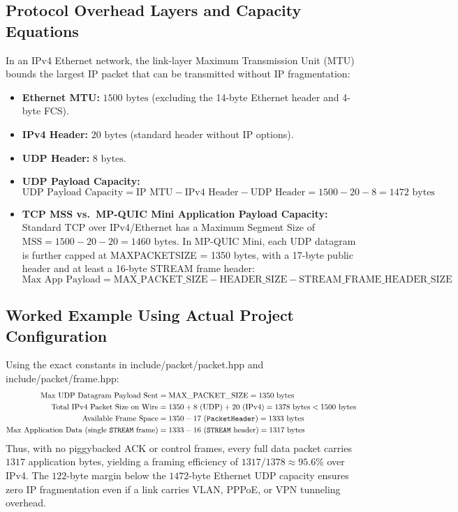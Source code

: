 \documentclass[10pt,a4paper]{article}
\newcommand{\codeul}{\textunderscore\hspace{0pt}}
\DeclareRobustCommand{\code}[1]{{\ttfamily\let\_\codeul #1}}
\begin{document}
\subsection{Protocol Overhead Layers and Capacity Equations}
In an IPv4 Ethernet network, the link-layer Maximum Transmission Unit (MTU) bounds the largest IP packet that can be transmitted without IP fragmentation:
\begin{itemize}
    \item \textbf{Ethernet MTU:} $1500\text{ bytes}$ (excluding the 14-byte Ethernet header and 4-byte FCS).
    \item \textbf{IPv4 Header:} $20\text{ bytes}$ (standard header without IP options).
    \item \textbf{UDP Header:} $8\text{ bytes}$.
    \item \textbf{UDP Payload Capacity:}
    \begin{equation}
        \text{UDP Payload Capacity} = \text{IP MTU} - \text{IPv4 Header} - \text{UDP Header} = 1500 - 20 - 8 = 1472\text{ bytes}
    \end{equation}
    \item \textbf{TCP MSS vs.\ MP-QUIC Mini Application Payload Capacity:} Standard TCP over IPv4/Ethernet has a Maximum Segment Size of $\text{MSS} = 1500 - 20 - 20 = 1460\text{ bytes}$. In MP-QUIC Mini, each UDP datagram is further capped at \code{MAX\_PACKET\_SIZE = 1350} bytes, with a 17-byte public header and at least a 16-byte \code{STREAM} frame header:
    \begin{equation}
        \text{Max App Payload} = \text{MAX\_PACKET\_SIZE} - \text{HEADER\_SIZE} - \text{STREAM\_FRAME\_HEADER\_SIZE}
    \end{equation}
\end{itemize}

\subsection{Worked Example Using Actual Project Configuration}
Using the exact constants in \code{include/packet/packet.hpp} and \code{include/packet/frame.hpp}:
\begin{align*}
    \text{Max UDP Datagram Payload Sent} &= \text{MAX\_PACKET\_SIZE} = 1350\text{ bytes} \\
    \text{Total IPv4 Packet Size on Wire} &= 1350 + 8\text{ (UDP)} + 20\text{ (IPv4)} = 1378\text{ bytes} < 1500\text{ bytes} \\
    \text{Available Frame Space} &= 1350 - 17\text{ (\code{PacketHeader})} = 1333\text{ bytes} \\
    \text{Max Application Data (single \code{STREAM} frame)} &= 1333 - 16\text{ (\code{STREAM} header)} = 1317\text{ bytes}
\end{align*}
Thus, with no piggybacked ACK or control frames, every full data packet carries $1317$ application bytes, yielding a framing efficiency of $1317 / 1378 \approx 95.6\%$ over IPv4. The $122$-byte margin below the $1472$-byte Ethernet UDP capacity ensures zero IP fragmentation even if a link carries VLAN, PPPoE, or VPN tunneling overhead.
\end{document}
